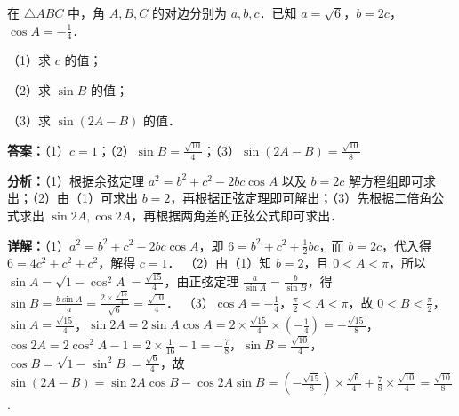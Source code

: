 \begin{question}[points=15]
在 $\triangle ABC$ 中，角 $A,B,C$ 的对边分别为 $a,b,c$．已知 $a=\sqrt{6}$，$b=2c$，$\cos A=-\frac{1}{4}$．

（1）求 $c$ 的值；

（2）求 $\sin B$ 的值；

（3）求 $\sin(2A-B)$ 的值．
\begin{solution}
\textbf{答案：}（1）$c=1$；（2）$\sin B=\frac{\sqrt{10}}{4}$；（3）$\sin(2A-B)=\frac{\sqrt{10}}{8}$

\textbf{分析：}（1）根据余弦定理 $a^2=b^2+c^2-2bc\cos A$ 以及 $b=2c$ 解方程组即可求出；（2）由（1）可求出 $b=2$，再根据正弦定理即可解出；（3）先根据二倍角公式求出 $\sin2A,\cos2A$，再根据两角差的正弦公式即可求出．

\textbf{详解：}（1）$a^2=b^2+c^2-2bc\cos A$，即 $6=b^2+c^2+\frac{1}{2}bc$，而 $b=2c$，代入得 $6=4c^2+c^2+c^2$，解得 $c=1$．
（2）由（1）知 $b=2$，且 $0<A<\pi$，所以 $\sin A=\sqrt{1-\cos^2 A}=\frac{\sqrt{15}}{4}$，由正弦定理 $\frac{a}{\sin A}=\frac{b}{\sin B}$，得 $\sin B=\frac{b\sin A}{a}=\frac{2\times\frac{\sqrt{15}}{4}}{\sqrt{6}}=\frac{\sqrt{10}}{4}$．
（3）$\cos A=-\frac{1}{4}$，$\frac{\pi}{2}<A<\pi$，故 $0<B<\frac{\pi}{2}$，$\sin A=\frac{\sqrt{15}}{4}$，$\sin2A=2\sin A\cos A=2\times\frac{\sqrt{15}}{4}\times(-\frac{1}{4})=-\frac{\sqrt{15}}{8}$，$\cos2A=2\cos^2A-1=2\times\frac{1}{16}-1=-\frac{7}{8}$，$\sin B=\frac{\sqrt{10}}{4}$，$\cos B=\sqrt{1-\sin^2B}=\frac{\sqrt{6}}{4}$，故 $\sin(2A-B)=\sin2A\cos B-\cos2A\sin B=(-\frac{\sqrt{15}}{8})\times\frac{\sqrt{6}}{4}+\frac{7}{8}\times\frac{\sqrt{10}}{4}=\frac{\sqrt{10}}{8}$.
\end{solution}
\end{question}


